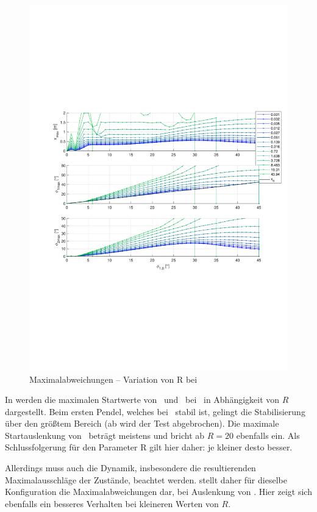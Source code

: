 \begin{figure}[htb]
	\centering
		\includegraphics[width=1\textwidth]{Bilder/QRVariation/ap2/R phi1 m.pdf}
	\caption{Maximalabweichungen -- Variation von R bei \apz}
	\label{fig:qrap2Rm}
\end{figure}

In  werden die maximalen Startwerte von \phe\ und \phz\ bei \apz\ in Abhängigkeit von $R$ dargestellt.
Beim ersten Pendel, welches bei \apz\ stabil ist, gelingt die Stabilisierung über den größtem Bereich (ab  wird der Test abgebrochen).
Die maximale Startauslenkung von \phz\ beträgt meistens  und bricht ab $R=20$ ebenfalls ein.
Als Schlussfolgerung für den Parameter R gilt hier daher: je kleiner desto besser.

Allerdings muss auch die Dynamik, insbesondere die resultierenden Maximalausschläge der Zustände, beachtet werden.
 stellt daher für dieselbe Konfiguration die Maximalabweichungen dar, bei Auslenkung von \phe.
Hier zeigt sich ebenfalls ein besseres Verhalten bei kleineren Werten von $R$.

